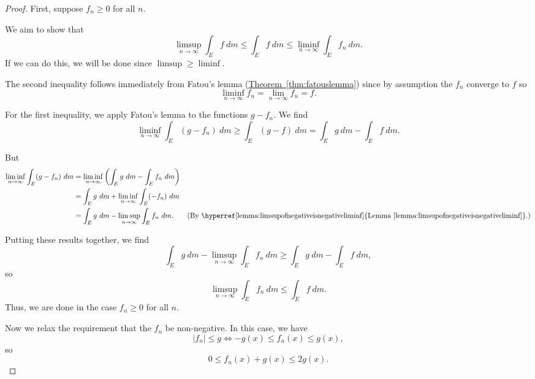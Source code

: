\documentclass[a4paper,12pt]{scrreprt}
\theoremstyle{definition}
\theoremstyle{plain}
\theoremstyle{remark}
\begin{document}
\begin{proof}
  First, suppose $f_{n} \geq 0$ for all $n$.

  We aim to show that
  \begin{equation*}
    \limsup_{n \to \infty} \int_{E} f\ dm \leq \int_{E} f\ dm \leq \liminf_{n \to \infty} \int_{E} f_{n}\ dm.
  \end{equation*}
  If we can do this, we will be done since $\limsup \geq \liminf$.

  The second inequality follows immediately from Fatou's lemma (\hyperref[thm:fatouslemma]{Theorem~\ref*{thm:fatouslemma}}) since by assumption the $f_{n}$ converge to $f$ so
  \begin{equation*}
    \liminf_{n \to \infty} f_{n} = \lim_{n \to \infty} f_{n} = f.
  \end{equation*}

  For the first inequality, we apply Fatou's lemma to the functions $g - f_{n}$. We find
  \begin{equation*}
    \liminf_{n \to \infty} \int_{E} (g - f_{n})\ dm \geq \int_{E} (g - f)\ dm = \int_{E} g\ dm - \int_{E} f\ dm.
  \end{equation*}

  But
  \begin{align*}
    \liminf_{n \to \infty} \int_{E} (g - f_{n})\ dm &= \liminf_{n \to \infty} \left( \int_{E} g\ dm - \int_{E} f_{n}\ dm \right) \\
    &= \int_{E} g\ dm + \liminf_{n \to \infty} \int_{E} (-f_{n})\ dm \\
    &= \int_{E} g\ dm - \limsup_{n \to \infty} \int_{E} f_{n}\ dm. &\left( \text{By \hyperref[lemma:limsupofnegativeisnegativeliminf]{Lemma~\ref*{lemma:limsupofnegativeisnegativeliminf}}.} \right)
  \end{align*}

  Putting these results together, we find
  \begin{equation*}
    \int_{E} g\ dm - \limsup_{n \to \infty} \int_{E} f_{n}\ dm \geq \int_{E} g\ dm - \int_{E} f\ dm,
  \end{equation*}
  so
  \begin{equation*}
    \limsup_{n \to \infty} \int_{E} f_{n}\ dm \leq \int_{E} f\ dm.
  \end{equation*}
  Thus, we are done in the case $f_{n} \geq 0$ for all $n$.

  Now we relax the requirement that the $f_{n}$ be non-negative. In this case, we have
  \begin{equation*}
    \left|f_{n}\right| \leq g \Longleftrightarrow -g(x) \leq f_{n}(x) \leq g(x),
  \end{equation*}
  so
  \begin{equation*}
    0 \leq f_{n}(x) + g(x) \leq 2g(x).
  \end{equation*}


\end{proof}
\end{document}
